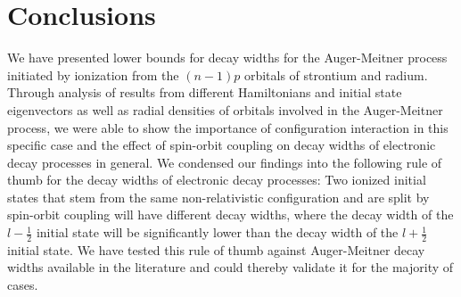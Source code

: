 \section{Conclusions}
\label{section:conclusions}

We have presented lower bounds for
decay widths for the Auger-Meitner process initiated by
ionization from the $(n-1)p$ orbitals of strontium and radium.
Through analysis of results from different Hamiltonians and initial state
eigenvectors as well as radial densities of orbitals involved in the
Auger-Meitner process, we were able to show the importance of configuration interaction
in this specific case and the effect of spin-orbit coupling on decay widths
of electronic decay processes in general.
We condensed our findings into the following rule of thumb for the decay widths
of electronic decay processes:
Two ionized initial states that stem from the same non-relativistic configuration and
are split by spin-orbit coupling will have different decay widths, where the decay width
of the $l-\frac12$ initial state will be significantly lower than the decay width of
the $l + \frac12$ initial state.
{We have tested this rule of thumb against Auger-Meitner decay widths available in the
literature and could thereby validate it for the majority
of cases.}
